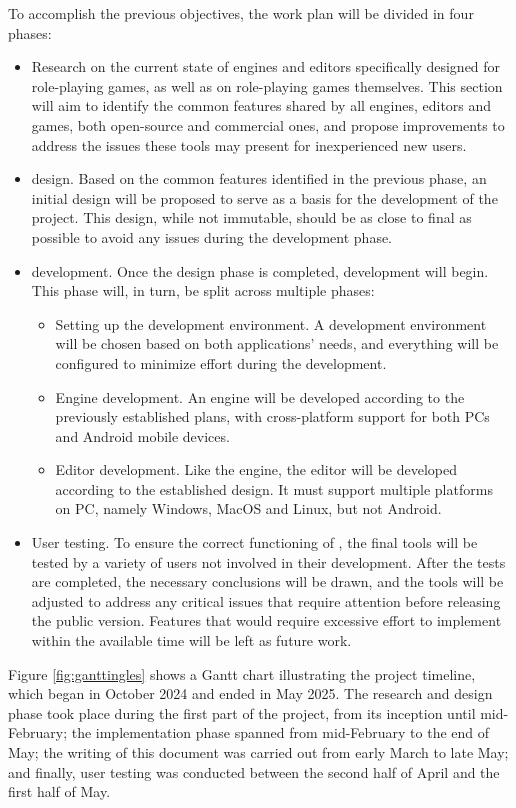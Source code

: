To accomplish the previous objectives, the work plan will be divided in four phases: 
\begin{itemize}
	\item Research on the current state of engines and editors specifically designed for role-playing games, as well as on role-playing games themselves. This section will aim to identify the common features shared by all engines, editors and games, both open-source and commercial ones, and propose improvements to address the issues these tools may present for inexperienced new users. 
	\item \baker{} design. Based on the common features identified in the previous phase, an initial design will be proposed to serve as a basis for the development of the project. This design, while not immutable, should be as close to final as possible to avoid any issues during the development phase.
	\item \baker{} development. Once the design phase is completed, development will begin. This phase will, in turn, be split across multiple phases:
		\begin{itemize}
			\item Setting up the development environment. A development environment will be chosen based on both applications' needs, and everything will be configured to minimize effort during the development.
			\item Engine development. An engine will be developed according to the previously established plans, with cross-platform support for both PCs and Android mobile devices.
			\item Editor development. Like the engine, the editor will be developed according to the established design. It must support multiple platforms on PC, namely Windows, MacOS and Linux, but not Android.
		\end{itemize}
	\item User testing. To ensure the correct functioning of \baker, the final tools will be tested by a variety of users not involved in their development. After the tests are completed, the necessary conclusions will be drawn, and the tools will be adjusted to address any critical issues that require attention before releasing the public version. Features that would require excessive effort to implement within the available time will be left as future work.
\end{itemize}

Figure \ref{fig:ganttingles} shows a Gantt chart illustrating the project timeline, which began in October 2024 and ended in May 2025. The research and design phase took place during the first part of the project, from its inception until mid-February; the implementation phase spanned from mid-February to the end of May; the writing of this document was carried out from early March to late May; and finally, user testing was conducted between the second half of April and the first half of May.


